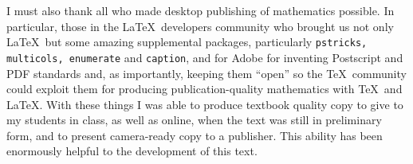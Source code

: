 I must also thank all who made desktop publishing of
mathematics possible.  In particular, those in the \LaTeX \ 
developers community who brought us not only \LaTeX \ but some amazing
supplemental packages, particularly {\tt pstricks, multicols, enumerate}
and {\tt caption}, and for Adobe for inventing Postscript and
PDF standards and, as importantly, keeping them ``open'' so
the \TeX \ community could exploit them for producing 
publication-quality mathematics with \TeX \ and \LaTeX.  
With these things I was able to produce
textbook quality copy to give to my students in class,
as well as online, when the text
was still in preliminary form, and to present  camera-ready
copy to a publisher.  This ability has been 
enormously helpful to the development of this text.



